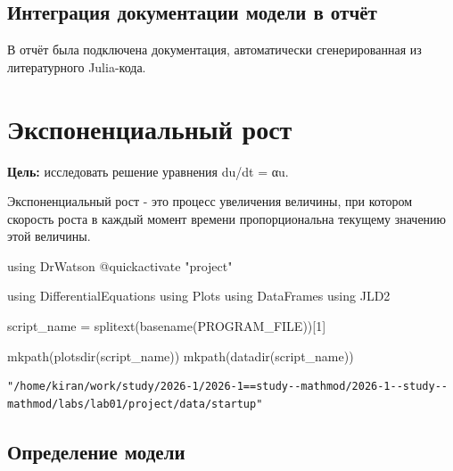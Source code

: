 \documentclass[
  russian,
  12pt,
  a4paper,
  DIV=11,
  numbers=noendperiod]{scrreprt}
\newenvironment{Shaded}{\begin{snugshade}}{\end{snugshade}}
\newcommand{\BuiltInTok}[1]{\textcolor[rgb]{0.00,0.23,0.31}{#1}}
\newcommand{\ConstantTok}[1]{\textcolor[rgb]{0.56,0.35,0.01}{#1}}
\newcommand{\FloatTok}[1]{\textcolor[rgb]{0.68,0.00,0.00}{#1}}
\newcommand{\FunctionTok}[1]{\textcolor[rgb]{0.28,0.35,0.67}{#1}}
\newcommand{\ImportTok}[1]{\textcolor[rgb]{0.00,0.46,0.62}{#1}}
\newcommand{\NormalTok}[1]{\textcolor[rgb]{0.00,0.23,0.31}{#1}}
\newcommand{\OperatorTok}[1]{\textcolor[rgb]{0.37,0.37,0.37}{#1}}
\newcommand{\PreprocessorTok}[1]{\textcolor[rgb]{0.68,0.00,0.00}{#1}}
\newcommand{\StringTok}[1]{\textcolor[rgb]{0.13,0.47,0.30}{#1}}
\begin{document}
\section{Интеграция документации модели в
отчёт}\label{ux438ux43dux442ux435ux433ux440ux430ux446ux438ux44f-ux434ux43eux43aux443ux43cux435ux43dux442ux430ux446ux438ux438-ux43cux43eux434ux435ux43bux438-ux432-ux43eux442ux447ux451ux442}

В отчёт была подключена документация, автоматически сгенерированная из
литературного Julia-кода.

\chapter{Экспоненциальный
рост}\label{ux44dux43aux441ux43fux43eux43dux435ux43dux446ux438ux430ux43bux44cux43dux44bux439-ux440ux43eux441ux442}

\textbf{Цель:} исследовать решение уравнения du/dt = αu.

Экспоненциальный рост - это процесс увеличения величины, при котором
скорость роста в каждый момент времени пропорциональна текущему значению
этой величины.

\begin{Shaded}
\begin{Highlighting}[]
\ImportTok{using} \BuiltInTok{DrWatson}
\PreprocessorTok{@quickactivate} \StringTok{"project"}

\ImportTok{using} \BuiltInTok{DifferentialEquations}
\ImportTok{using} \BuiltInTok{Plots}
\ImportTok{using} \BuiltInTok{DataFrames}
\ImportTok{using} \BuiltInTok{JLD2}

\NormalTok{script\_name }\OperatorTok{=} \FunctionTok{splitext}\NormalTok{(}\FunctionTok{basename}\NormalTok{(}\ConstantTok{PROGRAM\_FILE}\NormalTok{))[}\FloatTok{1}\NormalTok{]}

\FunctionTok{mkpath}\NormalTok{(}\FunctionTok{plotsdir}\NormalTok{(script\_name))}
\FunctionTok{mkpath}\NormalTok{(}\FunctionTok{datadir}\NormalTok{(script\_name))}
\end{Highlighting}
\end{Shaded}

\begin{verbatim}
"/home/kiran/work/study/2026-1/2026-1==study--mathmod/2026-1--study--mathmod/labs/lab01/project/data/startup"
\end{verbatim}

\section{Определение
модели}\label{ux43eux43fux440ux435ux434ux435ux43bux435ux43dux438ux435-ux43cux43eux434ux435ux43bux438}
\end{document}
